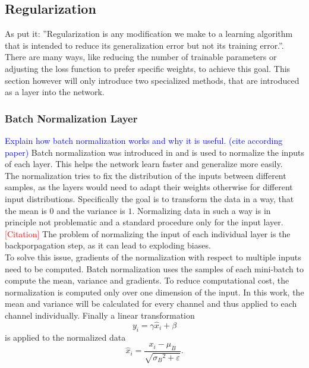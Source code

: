 \subsection{Regularization}\label{sec:regularization}
As \cite{deep_learning_book} put it: ''Regularization is any modification we make to a learning algorithm that is intended to reduce its generalization error but not its training error.''. There are many ways, like reducing the number of trainable parameters or adjusting the loss function to prefer specific weights, to achieve this goal. This section however will only introduce two specialized methods, that are introduced as a layer into the network.

\subsubsection{Batch Normalization Layer}\label{sec:batch_norm}
\textcolor{blue}{Explain how batch normalization works and why it is useful. (cite according paper)}
Batch normalization was introduced in \cite{batch_normalization_invention} and is used to normalize the inputs of each layer. This helps the network learn faster and generalize more easily.\\
The normalization tries to fix the distribution of the inputs between different samples, as the layers would need to adapt their weights otherwise for different input distributions. Specifically the goal is to transform the data in a way, that the mean is $0$ and the variance is $1$. Normalizing data in such a way is in principle not problematic and a standard procedure only for the input layer. \textcolor{red}{[Citation]} The problem of normalizing the input of each individual layer is the backporpagation step, as it can lead to exploding biases. \cite{batch_normalization_invention}\\
To solve this issue, gradients of the normalization with respect to multiple inputs need to be computed. Batch normalization uses the samples of each mini-batch to compute the mean, variance and gradients. To reduce computational cost, the normalization is computed only over one dimension of the input. In this work, the mean and variance will be calculated for every channel and thus applied to each channel individually. Finally a linear transformation
\begin{equation}
y_i = \gamma \hat{x}_i + \beta
\end{equation}
is applied to the normalized data
\begin{equation}
\hat{x}_i = \frac{x_i - \mu_B}{\sqrt{{\sigma_B}^2 + \varepsilon}}.
\end{equation}

